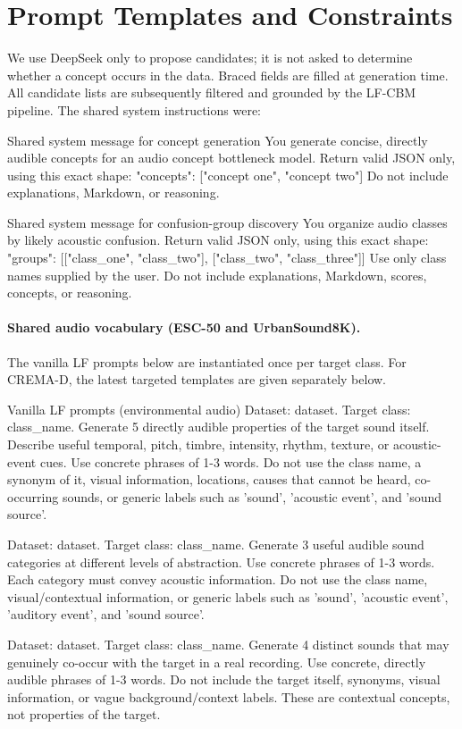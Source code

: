 \documentclass[10pt]{article}
\begin{document}
\section{Prompt Templates and Constraints}
\label{app:prompts}
\label{app:prompt-templates}
We use DeepSeek only to propose candidates; it is not asked to determine whether a concept occurs in the data. Braced fields are filled at generation time. All candidate lists are subsequently filtered and grounded by the LF-CBM pipeline. The shared system instructions were:

\begin{prompt}{Shared system message for concept generation}
You generate concise, directly audible concepts for an audio concept bottleneck model. Return valid JSON only, using this exact shape:
{"concepts": ["concept one", "concept two"]}
Do not include explanations, Markdown, or reasoning.
\end{prompt}

\begin{prompt}{Shared system message for confusion-group discovery}
You organize audio classes by likely acoustic confusion. Return valid JSON only, using this exact shape:
{"groups": [["class_one", "class_two"], ["class_two", "class_three"]]}
Use only class names supplied by the user. Do not include explanations, Markdown, scores, concepts, or reasoning.
\end{prompt}

\paragraph{Shared audio vocabulary (ESC-50 and UrbanSound8K).}
The vanilla LF prompts below are instantiated once per target class. For CREMA-D, the latest targeted templates are given separately below.

\begin{prompt}{Vanilla LF prompts (environmental audio)}
Dataset: {dataset}. Target class: {class_name}.
Generate 5 directly audible properties of the target sound itself. Describe useful temporal, pitch, timbre, intensity, rhythm, texture, or acoustic-event cues. Use concrete phrases of 1-3 words. Do not use the class name, a synonym of it, visual information, locations, causes that cannot be heard, co-occurring sounds, or generic labels such as 'sound', 'acoustic event', and 'sound source'.

Dataset: {dataset}. Target class: {class_name}.
Generate 3 useful audible sound categories at different levels of abstraction. Use concrete phrases of 1-3 words. Each category must convey acoustic information. Do not use the class name, visual/contextual information, or generic labels such as 'sound', 'acoustic event', 'auditory event', and 'sound source'.

Dataset: {dataset}. Target class: {class_name}.
Generate 4 distinct sounds that may genuinely co-occur with the target in a real recording. Use concrete, directly audible phrases of 1-3 words. Do not include the target itself, synonyms, visual information, or vague background/context labels. These are contextual concepts, not properties of the target.
\end{prompt}
\end{document}
